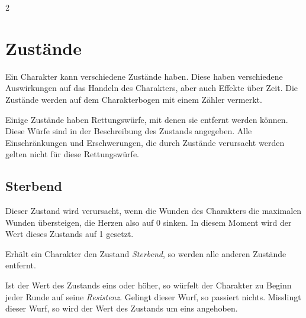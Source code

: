 \begin{multicols}{2}


\section{Zustände}

Ein Charakter kann verschiedene Zustände haben. Diese haben verschiedene Auswirkungen auf das Handeln des Charakters, aber auch Effekte über Zeit. Die Zustände werden auf dem Charakterbogen mit einem Zähler vermerkt.

Einige Zustände haben Rettungswürfe, mit denen sie entfernt werden können. Diese Würfe sind in der Beschreibung des Zustands angegeben. Alle Einschränkungen und Erschwerungen, die durch Zustände verursacht werden gelten nicht für diese Rettungswürfe.

\subsection{Sterbend}

Dieser Zustand wird verursacht, wenn die Wunden des Charakters die maximalen Wunden übersteigen, die Herzen also auf 0 sinken. In diesem Moment wird der Wert dieses Zustands auf 1 gesetzt.

Erhält ein Charakter den Zustand \textit{Sterbend}, so werden alle anderen Zustände entfernt.

Ist der Wert des Zustands eins oder höher, so würfelt der Charakter zu Beginn jeder Runde auf seine \textit{Resistenz}. Gelingt dieser Wurf, so passiert nichts. Misslingt dieser Wurf, so wird der Wert des Zustands um eins angehoben.


\end{multicols}
